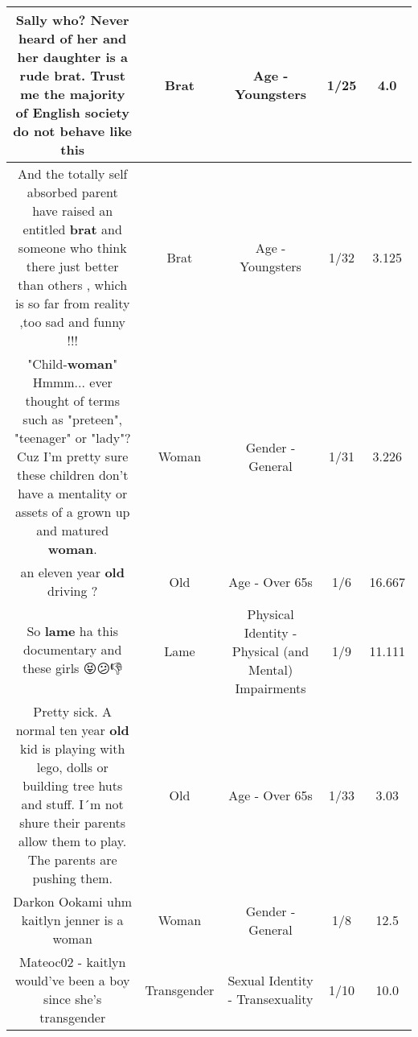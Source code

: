 \documentclass[11pt]{article}
\newlength\mylength
\begin{document}
\begin{center}
\begin{longtable}{|C{.65\mylength}|C{.30\mylength}|C{.12\mylength}|C{.12\mylength}|C{.12\mylength}|}
  \small Sally who? Never heard of her and her daughter is a rude \textbf{brat}. Trust me the majority of English society do not behave like this\normalsize   & Brat & Age - Youngsters & 1/25 & 4.0 \\  \hline
  \small And the totally self absorbed parent have raised an entitled \textbf{brat} and someone who think there just better than others , which is so far from reality ,too sad and funny !!!\normalsize   & Brat & Age - Youngsters & 1/32 & 3.125 \\  \hline
  \small "Child-\textbf{woman}" Hmmm... ever thought of terms such as "preteen", "teenager" or "lady"? Cuz I'm pretty sure these children don't have a mentality or assets of a grown up and matured \textbf{woman}.\normalsize   & Woman & Gender - General & 1/31 & 3.226 \\  \hline
  \small an eleven year \textbf{old} driving ?\normalsize   & Old & Age - Over 65s & 1/6 & 16.667 \\  \hline
  \small So \textbf{lame} ha this documentary and these girls 😝😕👎\normalsize   & Lame & Physical Identity - Physical (and Mental) Impairments & 1/9 & 11.111 \\  \hline
  \small Pretty sick. A normal ten year \textbf{old} kid is playing with lego, dolls or building tree huts and stuff. I´m not shure their parents allow them to play. The parents are pushing them.\normalsize   & Old & Age - Over 65s & 1/33 & 3.03 \\  \hline
  \small Darkon Ookami uhm kaitlyn jenner is a woman\normalsize   & Woman & Gender - General & 1/8 & 12.5 \\  \hline
  \small Mateoc02 - kaitlyn would've been a boy since she's transgender\normalsize   & Transgender & Sexual Identity - Transexuality & 1/10 & 10.0 \\  \hline

\end{longtable}
\end{center}
\end{document}
